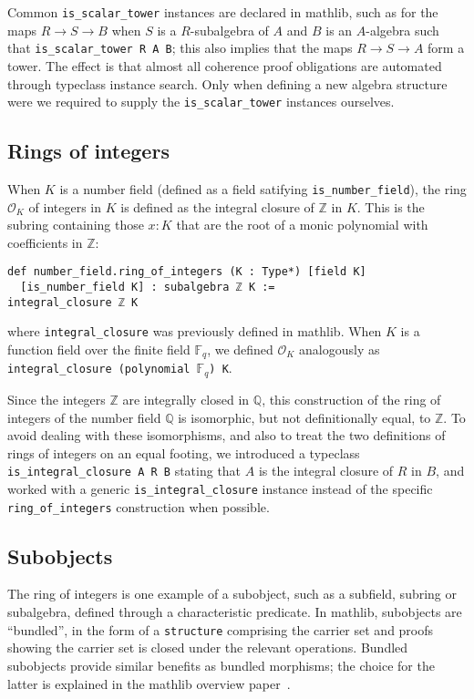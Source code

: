 \documentclass[sn-mathphys]{sn-jnl}%
\newcommand{\lean}[1]{\texttt{#1}\xspace}
\newcommand*{\OK}[1][K]{\mathcal{O}_{#1}}
\newcommand*{\Fq}[1][q]{\mathbb{F}_{#1}}
\newcommand{\mathlib}{\textsf{mathlib}\xspace}
\newcommand{\QQ}{\mathbb{Q}}
\renewcommand{\Z}{\mathbb{Z}}
\begin{document}
Common \lean{is\_scalar\_tower} instances are declared in \mathlib,
such as for the maps $R \to S \to B$ when $S$ is a $R$-subalgebra of $A$ and $B$ is an $A$-algebra such that \lean{is\_scalar\_tower R A B};
this also implies that the maps $R \to S \to A$ form a tower.
The effect is that almost all coherence proof obligations are automated through typeclass instance search.
Only when defining a new algebra structure were we required to supply the \lean{is\_scalar\_tower} instances ourselves.

\subsection{Rings of integers} \label{sec:ring-of-integers}

When $K$ is a number field (defined as a field satifying \lean{is\_number\_field}), the ring $\OK$ of integers in $K$ is defined as the integral closure of $\Z$ in $K$.
This is the subring containing those $x : K$ that are the root of a monic polynomial with coefficients in $\Z$:
\begin{lstlisting}
def number_field.ring_of_integers (K : Type*) [field K]
  [is_number_field K] : subalgebra ℤ K :=
integral_closure ℤ K
\end{lstlisting}
where \lean{integral\_closure} was previously defined in \mathlib.
When $K$ is a function field over the finite field $\Fq$, we defined $\OK$ analogously as \lean{integral\_closure (polynomial $\Fq$) K}.

Since the integers $\Z$ are integrally closed in $\QQ$, this construction of the ring of integers of the number field $\QQ$ is isomorphic, but not definitionally equal, to $\Z$.
To avoid dealing with these isomorphisms, and also to treat the two definitions of rings of integers on an equal footing,
we introduced a typeclass \lean{is\_integral\_closure A R B} stating that $A$ is the integral closure of $R$ in $B$,
and worked with a generic \lean{is\_integral\_closure} instance instead of the specific \lean{ring\_of\_integers} construction when possible.

\subsection{Subobjects} \label{sec:subobjects}

The ring of integers is one example of a subobject, such as a subfield, subring or subalgebra, defined through a characteristic predicate.
In \mathlib, subobjects are ``bundled'', in the form of a \lean{structure} comprising the carrier set and proofs showing the carrier set is closed under the relevant operations.
Bundled subobjects provide similar benefits as bundled morphisms; the choice for the latter is explained in the \mathlib overview paper~\cite{mathlib}.
\end{document}
